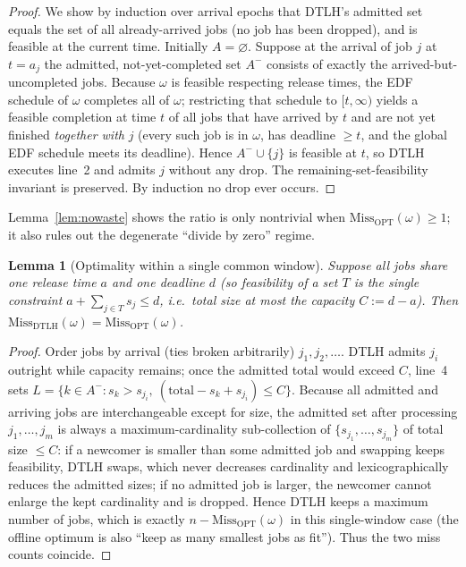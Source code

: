 \documentclass{amsart}
\newtheorem{lemma}[theorem]{Lemma}
\theoremstyle{definition}
\begin{document}
\begin{proof}
We show by induction over arrival epochs that DTLH's admitted set equals the set
of all already-arrived jobs (no job has been dropped), and is feasible at the
current time. Initially $A=\varnothing$. Suppose at the arrival of job $j$ at
$t=a_j$ the admitted, not-yet-completed set $A^-$ consists of exactly the
arrived-but-uncompleted jobs. Because $\omega$ is feasible respecting release
times, the EDF schedule of $\omega$ completes all of $\omega$; restricting that
schedule to $[t,\infty)$ yields a feasible completion at time $t$ of all jobs
that have arrived by $t$ and are not yet finished \emph{together with} $j$
(every such job is in $\omega$, has deadline $\ge t$, and the global EDF schedule
meets its deadline). Hence $A^-\cup\{j\}$ is feasible at $t$, so DTLH executes
line~2 and admits $j$ without any drop. The remaining-set-feasibility invariant
is preserved. By induction no drop ever occurs.
\end{proof}

Lemma~\ref{lem:nowaste} shows the ratio is only nontrivial when
$\mathrm{Miss}_{\mathrm{OPT}}(\omega)\ge 1$; it also rules out the degenerate
``divide by zero'' regime.

\begin{lemma}[Optimality within a single common window]\label{lem:onewindow}
Suppose all jobs share one release time $a$ and one deadline $d$ (so feasibility
of a set $T$ is the single constraint $a+\sum_{j\in T}s_j\le d$, i.e.\ total size
at most the capacity $C:=d-a$). Then
$\mathrm{Miss}_{\mathrm{DTLH}}(\omega)=\mathrm{Miss}_{\mathrm{OPT}}(\omega)$.
\end{lemma}

\begin{proof}
Order jobs by arrival (ties broken arbitrarily) $j_1,j_2,\dots$. DTLH admits
$j_i$ outright while capacity remains; once the admitted total would exceed $C$,
line~4 sets $L=\{k\in A^- : s_k>s_{j_i},\ (\text{total}-s_k+s_{j_i})\le C\}$.
Because all admitted and arriving jobs are interchangeable except for size, the
admitted set after processing $j_1,\dots,j_m$ is always a maximum-cardinality
sub-collection of $\{s_{j_1},\dots,s_{j_m}\}$ of total size $\le C$: if a
newcomer is smaller than some admitted job and swapping keeps feasibility, DTLH
swaps, which never decreases cardinality and lexicographically reduces the
admitted sizes; if no admitted job is larger, the newcomer cannot enlarge the
kept cardinality and is dropped. Hence DTLH keeps a maximum number of jobs, which
is exactly $n-\mathrm{Miss}_{\mathrm{OPT}}(\omega)$ in this single-window case
(the offline optimum is also ``keep as many smallest jobs as fit''). Thus the
two miss counts coincide.
\end{proof}
\end{document}
